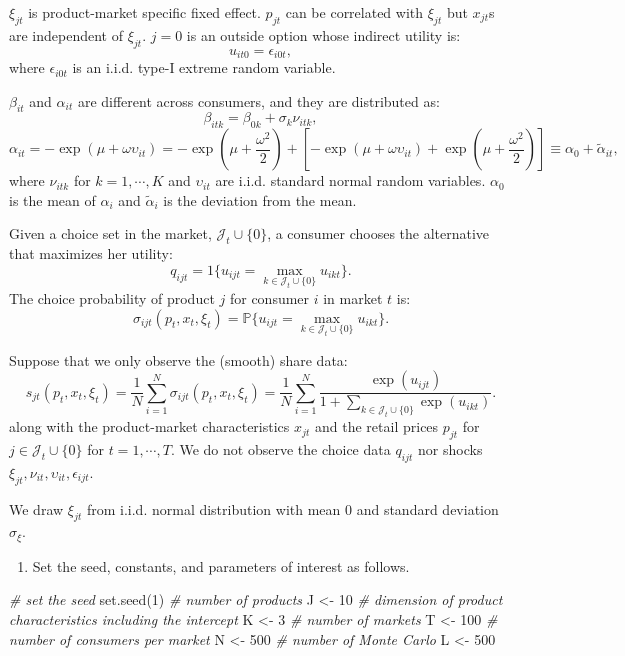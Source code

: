 \documentclass[
]{book}
\newenvironment{Shaded}{\begin{snugshade}}{\end{snugshade}}
\newcommand{\CommentTok}[1]{\textcolor[rgb]{0.56,0.35,0.01}{\textit{#1}}}
\newcommand{\DecValTok}[1]{\textcolor[rgb]{0.00,0.00,0.81}{#1}}
\newcommand{\FunctionTok}[1]{\textcolor[rgb]{0.00,0.00,0.00}{#1}}
\newcommand{\NormalTok}[1]{#1}
\newcommand{\OtherTok}[1]{\textcolor[rgb]{0.56,0.35,0.01}{#1}}
\providecommand{\tightlist}{%
  \setlength{\itemsep}{0pt}\setlength{\parskip}{0pt}}
\begin{document}
\(\xi_{jt}\) is product-market specific fixed effect. \(p_{jt}\) can be correlated with \(\xi_{jt}\) but \(x_{jt}\)s are independent of \(\xi_{jt}\). \(j = 0\) is an outside option whose indirect utility is:
\[
u_{it0} = \epsilon_{i0t},
\]
where \(\epsilon_{i0t}\) is an i.i.d. type-I extreme random variable.

\(\beta_{it}\) and \(\alpha_{it}\) are different across consumers, and they are distributed as:
\[
\beta_{itk} = \beta_{0k} + \sigma_k \nu_{itk},
\]
\[
\alpha_{it} = - \exp(\mu + \omega \upsilon_{it}) = - \exp(\mu + \frac{\omega^2}{2}) + [- \exp(\mu + \omega \upsilon_{it}) + \exp(\mu + \frac{\omega^2}{2})] \equiv \alpha_0 + \tilde{\alpha}_{it},
\]
where \(\nu_{itk}\) for \(k = 1, \cdots, K\) and \(\upsilon_{it}\) are i.i.d. standard normal random variables. \(\alpha_0\) is the mean of \(\alpha_i\) and \(\tilde{\alpha}_i\) is the deviation from the mean.

Given a choice set in the market, \(\mathcal{J}_t \cup \{0\}\), a consumer chooses the alternative that maximizes her utility:
\[
q_{ijt} = 1\{u_{ijt} = \max_{k \in \mathcal{J}_t \cup \{0\}} u_{ikt}\}.
\]
The choice probability of product \(j\) for consumer \(i\) in market \(t\) is:
\[
\sigma_{ijt}(p_t, x_t, \xi_t) = \mathbb{P}\{u_{ijt} = \max_{k \in \mathcal{J}_t \cup \{0\}} u_{ikt}\}.
\]

Suppose that we only observe the (smooth) share data:
\[
s_{jt}(p_t, x_t, \xi_t) = \frac{1}{N} \sum_{i = 1}^N \sigma_{ijt}(p_t, x_t, \xi_t) = \frac{1}{N} \sum_{i = 1}^N \frac{\exp(u_{ijt})}{1 + \sum_{k \in \mathcal{J}_t \cup \{0\}} \exp(u_{ikt})}. 
\]
along with the product-market characteristics \(x_{jt}\) and the retail prices \(p_{jt}\) for \(j \in \mathcal{J}_t \cup \{0\}\) for \(t = 1, \cdots, T\). We do not observe the choice data \(q_{ijt}\) nor shocks \(\xi_{jt}, \nu_{it}, \upsilon_{it}, \epsilon_{ijt}\).

We draw \(\xi_{jt}\) from i.i.d. normal distribution with mean 0 and standard deviation \(\sigma_{\xi}\).

\begin{enumerate}
\def\labelenumi{\arabic{enumi}.}
\tightlist
\item
  Set the seed, constants, and parameters of interest as follows.
\end{enumerate}

\begin{Shaded}
\begin{Highlighting}[]
\CommentTok{\# set the seed}
\FunctionTok{set.seed}\NormalTok{(}\DecValTok{1}\NormalTok{)}
\CommentTok{\# number of products}
\NormalTok{J }\OtherTok{\textless{}{-}} \DecValTok{10}
\CommentTok{\# dimension of product characteristics including the intercept}
\NormalTok{K }\OtherTok{\textless{}{-}} \DecValTok{3}
\CommentTok{\# number of markets}
\NormalTok{T }\OtherTok{\textless{}{-}} \DecValTok{100}
\CommentTok{\# number of consumers per market}
\NormalTok{N }\OtherTok{\textless{}{-}} \DecValTok{500}
\CommentTok{\# number of Monte Carlo}
\NormalTok{L }\OtherTok{\textless{}{-}} \DecValTok{500}
\end{Highlighting}
\end{Shaded}
\end{document}
